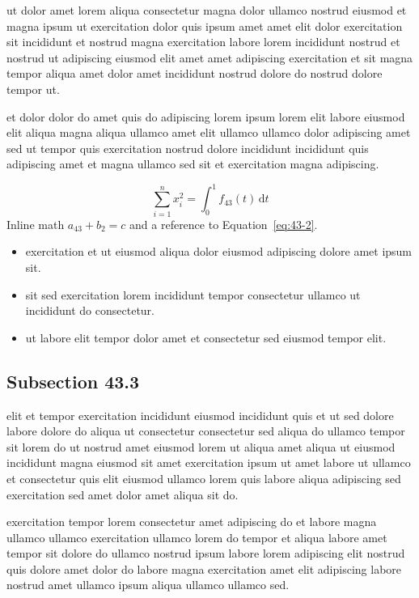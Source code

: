 \documentclass{article}
\begin{document}
ut dolor amet lorem aliqua consectetur magna dolor ullamco nostrud eiusmod et magna ipsum ut exercitation dolor quis ipsum amet amet elit dolor exercitation sit incididunt et nostrud magna exercitation labore lorem incididunt nostrud et nostrud ut adipiscing eiusmod elit amet amet adipiscing exercitation et sit magna tempor aliqua amet dolor amet incididunt nostrud dolore do nostrud dolore tempor ut.

et dolor dolor do amet quis do adipiscing lorem ipsum lorem elit labore eiusmod elit aliqua magna aliqua ullamco amet elit ullamco ullamco dolor adipiscing amet sed ut tempor quis exercitation nostrud dolore incididunt incididunt quis adipiscing amet et magna ullamco sed sit et exercitation magna adipiscing.

\begin{equation}\label{eq:43-2}
  \sum_{i=1}^{n} x_i^{2} = \int_0^1 f_{43}(t)\,\mathrm{d}t
\end{equation}
Inline math $a_{43} + b_{2} = c$ and a reference to Equation~\eqref{eq:43-2}.

\begin{itemize}
  \item exercitation et ut eiusmod aliqua dolor eiusmod adipiscing dolore amet ipsum sit.
  \item sit sed exercitation lorem incididunt tempor consectetur ullamco ut incididunt do consectetur.
  \item ut labore elit tempor dolor amet et consectetur sed eiusmod tempor elit.
\end{itemize}

\subsection{Subsection 43.3}\label{sec:43-3}
elit et tempor exercitation incididunt eiusmod incididunt quis et ut sed dolore labore dolore do aliqua ut consectetur consectetur sed aliqua do ullamco tempor sit lorem do ut nostrud amet eiusmod lorem ut aliqua amet aliqua ut eiusmod incididunt magna eiusmod sit amet exercitation ipsum ut amet labore ut ullamco et consectetur quis elit eiusmod ullamco lorem quis labore aliqua adipiscing sed exercitation sed amet dolor amet aliqua sit do.

exercitation tempor lorem consectetur amet adipiscing do et labore magna ullamco ullamco exercitation ullamco lorem do tempor et aliqua labore amet tempor sit dolore do ullamco nostrud ipsum labore lorem adipiscing elit nostrud quis dolore amet dolor do labore magna exercitation amet elit adipiscing labore nostrud amet ullamco ipsum aliqua ullamco ullamco sed.
\end{document}
